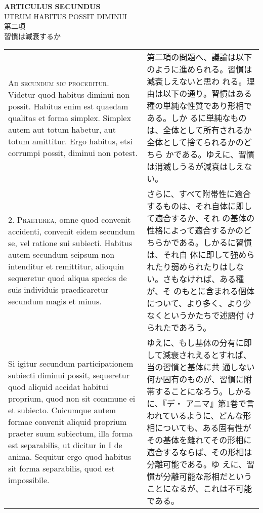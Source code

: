 \documentclass[10pt]{jsarticle} %
\begin{document}
\newpage



\begin{center}
{\Large {\bf ARTICULUS SECUNDUS}}\\ {\large UTRUM HABITUS POSSIT
DIMINUI}\\ {\Large 第二項\\習慣は減衰するか}
\end{center}

\begin{longtable}{p{21em}p{21em}}

{\scshape Ad secundum sic proceditur}. Videtur quod habitus diminui
non possit. Habitus enim est quaedam qualitas et forma
simplex. Simplex autem aut totum habetur, aut totum amittitur. Ergo
habitus, etsi corrumpi possit, diminui non potest.

&

第二項の問題へ、議論は以下のように進められる。習慣は減衰しえないと思わ
れる。理由は以下の通り。習慣はある種の単純な性質であり形相である。しか
るに単純なものは、全体として所有されるか全体として捨てられるかのどちら
かである。ゆえに、習慣は消滅しうるが減衰はしえない。


\\



2. {\scshape Praeterea}, omne quod convenit accidenti, convenit eidem
secundum se, vel ratione sui subiecti. Habitus autem secundum seipsum
non intenditur et remittitur, alioquin sequeretur quod aliqua species
de suis individuis praedicaretur secundum magis et minus.

&

さらに、すべて附帯性に適合するものは、それ自体に即して適合するか、それ
の基体の性格によって適合するかのどちらかである。しかるに習慣は、それ自
体に即して強められたり弱められたりはしない。さもなければ、ある種が、そ
のもとに含まれる個体について、より多く、より少なくというかたちで述語付
けられたであろう。

\\


Si igitur secundum participationem subiecti diminui possit, sequeretur
quod aliquid accidat habitui proprium, quod non sit commune ei et
subiecto. Cuicumque autem formae convenit aliquid proprium praeter
suum subiectum, illa forma est separabilis, ut dicitur in I de
anima. Sequitur ergo quod habitus sit forma separabilis, quod est
impossibile.

&

ゆえに、もし基体の分有に即して減衰されえるとすれば、当の習慣と基体に共
通しない何か固有のものが、習慣に附帯することになろう。しかるに、『デ・
アニマ』第1巻で言われているように、どんな形相についても、ある固有性が
その基体を離れてその形相に適合するならば、その形相は分離可能である。ゆ
えに、習慣が分離可能な形相だということになるが、これは不可能である。


\end{longtable}
\end{document}
